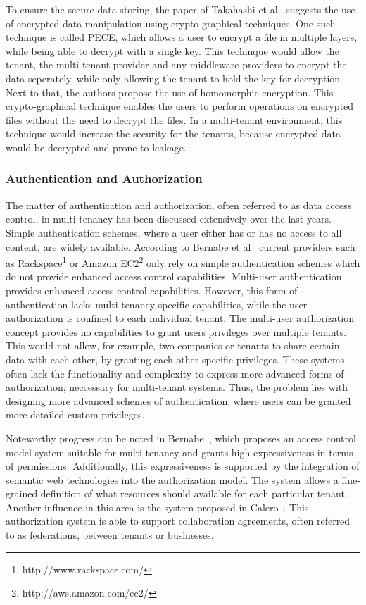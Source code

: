 To ensure the secure data storing, the paper of Takahashi et al~\cite{Takahashi2012Security} suggests the use of encrypted data manipulation using crypto-graphical techniques. 
One such technique is called \acf{PECE}, which allows a user to encrypt a file in multiple layers, while being able to decrypt with a single key.
This techinque would allow the tenant, the multi-tenant provider and any middleware providers to encrypt the data seperately, while only allowing the tenant to hold the key for decryption.
Next to that, the authors propose the use of homomorphic encryption. 
This crypto-graphical technique enables the users to perform operations on encrypted files without the need to decrypt the files.
In a multi-tenant environment, this technique would increase the security for the tenants, because encrypted data would be decrypted and prone to leakage.

\subsubsection{Authentication and Authorization}
The matter of authentication and authorization, often referred to as data access control, in multi-tenancy has been discussed extensively over the last years. 
Simple authentication schemes, where a user either has or has no access to all content, are widely available.
According to Bernabe et al~\cite{Bernabe2012Auth} current providers such as Rackspace\footnote{http://www.rackspace.com/} or Amazon EC2\footnote{http://aws.amazon.com/ec2/} only rely on simple authentication schemes which do not provide enhanced access control capabilities. 
Multi-user authentication provides enhanced access control capabilities.
However, this form of authentication lacks multi-tenancy-specific capabilities, while the user authorization is confined to each individual tenant. %
The multi-user authorization concept provides no capabilities to grant users privileges over multiple tenants. 
This would not allow, for example, two companies or tenants to share certain data with each other, by granting each other specific privileges.
These systems often lack the functionality and complexity to express more advanced forms of authorization, neccessary for multi-tenant systems.
Thus, the problem lies with designing more advanced schemes of authentication, where users can be granted more detailed custom privileges.

Noteworthy progress can be noted in Bernabe~\cite{Bernabe2012Auth}, which proposes an access control model system suitable for multi-tenancy and grants high expressiveness in terms of permissions. 
Additionally, this expressiveness is supported by the integration of semantic web technologies into the authorization model. 
The system allows a fine-grained definition of what resources should available for each particular tenant. 
Another influence in this area is the system proposed in Calero~\cite{Calero2010Auth}. 
This authorization system is able to support collaboration agreements, often referred to as federations, between tenants or businesses.

